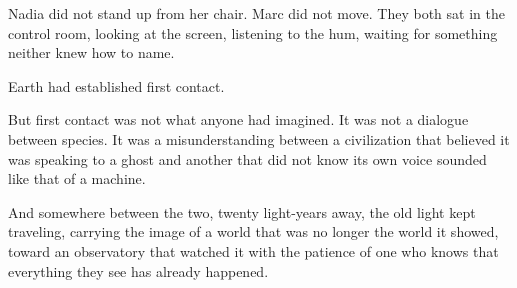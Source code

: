 \documentclass[11pt,a5paper,twoside]{book}
\begin{document}
Nadia did not stand up from her chair. Marc did not move. They both sat in the control room, looking at the screen, listening to the hum, waiting for something neither knew how to name.

Earth had established first contact.

But first contact was not what anyone had imagined. It was not a dialogue between species. It was a misunderstanding between a civilization that believed it was speaking to a ghost and another that did not know its own voice sounded like that of a machine.

And somewhere between the two, twenty light-years away, the old light kept traveling, carrying the image of a world that was no longer the world it showed, toward an observatory that watched it with the patience of one who knows that everything they see has already happened.
\end{document}
